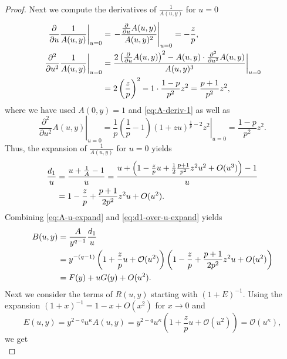 \documentclass[10pt,a4paper]{amsart}
\begin{document}
\begin{proof}
    Next we compute the derivatives of $\frac{1}{A(u,y)}$ for $u=0$
    \begin{align}
        \left.\frac{\partial }{\partial u} \frac{1}{A(u,y)}\right|_{u=0}
        &= \left. -\frac{\frac{\partial }{\partial u} A(u,y)}{A(u,y)^2} \right|_{u=0}
        = -\frac{z}{p},
        \label{eq:invA-deriv-1}
        \\
        \left.\frac{\partial^2 }{\partial u^2} \frac{1}{A(u,y)}\right|_{u=0}
        &= \frac{2 \left(\frac{\partial }{\partial u} A(u,y) \right)^2 - A(u,y) \cdot \frac{\partial^2 }{\partial u^2} A(u,y)}{A(u,y)^3} \bigg|_{u=0} \notag \\
        &= 2 \left(\frac{z}{p}\right)^2 - 1 \cdot \frac{1-p}{p^2}z^2
        = \frac{p+1}{p^2}z^2,
        \label{eq:invA-deriv-2}
    \end{align}
    where we have used $A(0,y) = 1$ and \eqref{eq:A-deriv-1} as well as
    \begin{equation*}
        \left.\frac{\partial^2 }{\partial u^2} A(u,y)\right|_{u=0}
        = \left.\frac{1}{p}\left(\frac{1}{p}-1\right)(1+zu)^{\frac{1}{p}-2} z^2\right|_{u=0}
        = \frac{1-p}{p^2}z^2.
        \label{eq:A-deriv-2}
    \end{equation*}
    Thus, the expansion of $\frac{1}{A(u,y)}$ for $u=0$ yields
    \begin{align}
        \label{eq:d1-over-u-expand}
        \frac{d_1}{u}
        &= \frac{u + \frac{1}{A} - 1}{u}
        = \frac{u  + \left( 1 - \frac{z}{p} u + \frac12 \frac{p+1}{p^2}z^2 u^2 + O(u^3) \right) - 1}{u} \notag \\
        &= 1-\frac{z}{p} + \frac{p+1}{2p^2}z^2 u + O(u^2).
    \end{align}
    Combining \eqref{eq:A-u-expand} and \eqref{eq:d1-over-u-expand} yields
    \begin{align}
        B(u,y)
        &= \frac{A}{y^{q-1}}\frac{d_1}{u} \notag\\
        &= y^{-(q-1)} \left( 1 + \frac{z}{p} u + \mathcal{O}(u^2) \right) \left( 1 - \frac{z}{p} + \frac{p+1}{2p^2}z^2 u + O(u^2) \right) \notag\\
        &= F(y) + uG(y) + O(u^2). \label{eq:B-u-expand}
    \end{align}
    Next we consider the terms of $R(u,y)$ starting with $(1+E)^{-1}$.
    Using the expansion $(1+x)^{-1} = 1 - x + O(x^2)$ for $x \to 0$ and
    \[
        E(u,y) = y^{2-q}u^\kappa A(u,y) = y^{2-q}u^\kappa \left( 1 + \frac{z}{p} u + \mathcal{O}(u^2) \right) = \mathcal{O}(u^\kappa),
    \]
    we get
    \begin{equation}

\end{equation}
\end{proof}
\end{document}
